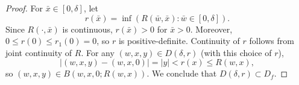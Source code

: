 \begin{proof}
For $\bar x \in [0,\delta]$, let
\begin{equation}
r(\bar x) = \inf (R(\bar w, \bar x) : \bar w \in [0, \delta]).
\end{equation}
Since $R(\cdot, \bar x)$ is continuous, $r(\bar x) > 0$
for $\bar x > 0$. Moreover, $0 \le r(0) \le r_1(0) = 0$, so $r$ is positive-definite.
Continuity of $r$ follows from joint continuity of $R$.
For any $(w, x, y) \in D(\delta, r)$ (with this choice of $r$),
\begin{equation}
|(w, x, y) - (w, x, 0)| = |y| < r(x) \leq R(w, x),
\end{equation}
so $(w, x, y) \in B(w, x, 0; R(w, x))$.
We conclude that $D(\delta, r) \subset D_f$.
\end{proof}